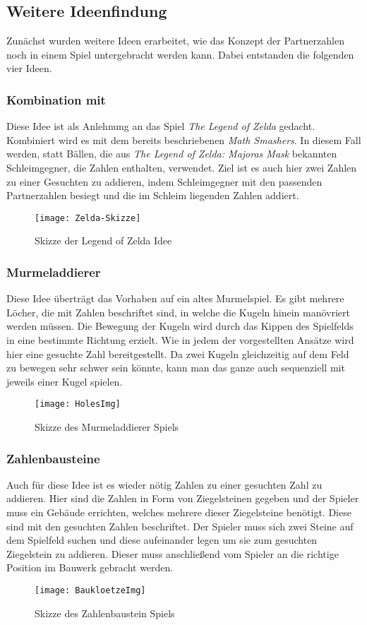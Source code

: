 \subsection{Weitere Ideenfindung}
Zunächst wurden weitere Ideen erarbeitet, wie das Konzept der Partnerzahlen noch in einem Spiel untergebracht werden kann. Dabei entstanden die folgenden vier Ideen.
\subsubsection{Kombination mit }
Diese Idee ist als Anlehnung an das Spiel \textit{The Legend of Zelda} gedacht. Kombiniert wird es mit dem bereits beschriebenen \textit{Math Smashers}. In diesem Fall werden, statt Bällen, die aus \textit{The Legend of Zelda: Majoras Mask}\cite{zelda} bekannten Schleimgegner, die Zahlen enthalten, verwendet. Ziel ist es auch hier zwei Zahlen zu einer Gesuchten zu addieren, indem Schleimgegner mit den passenden Partnerzahlen besiegt und die im Schleim liegenden Zahlen addiert.
\begin{figure}[htb]
	\centering
	\texttt{[image: Zelda-Skizze]}
	\caption{Skizze der Legend of Zelda Idee\label{fig:zelda}}
\end{figure}
\subsubsection{Murmeladdierer}
Diese Idee überträgt das Vorhaben auf ein altes Murmelspiel. Es gibt mehrere Löcher, die mit Zahlen beschriftet sind, in welche die Kugeln hinein manövriert werden müssen. Die Bewegung der Kugeln wird durch das Kippen des Spielfelds in eine bestimmte Richtung erzielt. Wie in jedem der vorgestellten Ansätze wird hier eine gesuchte Zahl bereitgestellt. Da zwei Kugeln gleichzeitig auf dem Feld zu bewegen sehr schwer sein könnte, kann man das ganze auch sequenziell mit jeweils einer Kugel spielen.
\begin{figure}[htb]
	\centering
	\texttt{[image: HolesImg]}
	\caption{Skizze des Murmeladdierer Spiels\label{fig:murmadd}}
\end{figure}
\subsubsection{Zahlenbausteine}
Auch für diese Idee ist es wieder nötig Zahlen zu einer gesuchten Zahl zu addieren. Hier sind die Zahlen in Form von Ziegelsteinen gegeben und der Spieler muss ein Gebäude errichten, welches mehrere dieser Ziegelsteine benötigt. Diese sind mit den gesuchten Zahlen beschriftet. Der Spieler muss sich zwei Steine auf dem Spielfeld suchen und diese aufeinander legen um sie zum gesuchten Ziegelstein zu addieren. Dieser muss anschließend vom Spieler an die richtige Position im Bauwerk gebracht werden.
\begin{figure}[htb]
	\centering
	\texttt{[image: BaukloetzeImg]}
	\caption{Skizze des Zahlenbaustein Spiels\label{fig:baustein}}
\end{figure}
